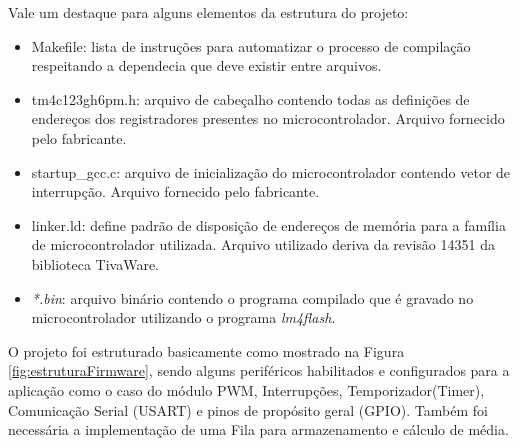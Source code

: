 Vale um destaque para alguns elementos da estrutura do projeto:


\begin{itemize}
\item Makefile: lista de instruções para automatizar o processo de compilação respeitando a dependecia que deve existir entre arquivos.
\item tm4c123gh6pm.h: arquivo de cabeçalho contendo todas as definições de endereços dos registradores presentes no microcontrolador. Arquivo fornecido pelo fabricante. 
\item startup\_gcc.c: arquivo de inicialização do microcontrolador contendo vetor de interrupção. Arquivo fornecido pelo fabricante.
\item linker.ld: define padrão de disposição de endereços de memória para a família de microcontrolador utilizada. Arquivo utilizado deriva da revisão 14351 da biblioteca TivaWare. 
\item \emph{*.bin}: arquivo binário contendo o programa compilado que é gravado no microcontrolador utilizando o programa \emph{lm4flash}.
\end{itemize}





O projeto foi estruturado basicamente como mostrado na Figura \ref{fig:estruturaFirmware}, sendo alguns periféricos habilitados e configurados para a aplicação como o caso do módulo PWM, Interrupções, Temporizador(Timer), Comunicação Serial (USART) e pinos de propósito geral (GPIO). Também foi necessária a implementação de uma Fila para armazenamento e cálculo de média.




